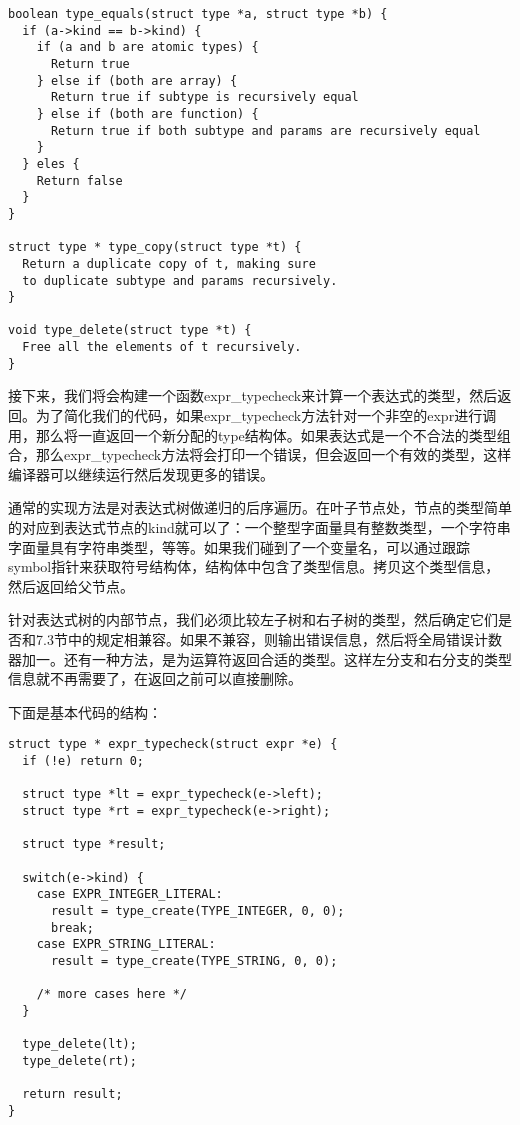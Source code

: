 \documentclass[cn,11pt,chinese]{elegantbook}
\begin{document}
\begin{verbatim}
boolean type_equals(struct type *a, struct type *b) {
  if (a->kind == b->kind) {
    if (a and b are atomic types) {
      Return true
    } else if (both are array) {
      Return true if subtype is recursively equal
    } else if (both are function) {
      Return true if both subtype and params are recursively equal
    }
  } eles {
    Return false
  }
}

struct type * type_copy(struct type *t) {
  Return a duplicate copy of t, making sure
  to duplicate subtype and params recursively.
}

void type_delete(struct type *t) {
  Free all the elements of t recursively.
}
\end{verbatim}

接下来，我们将会构建一个函数expr\_typecheck来计算一个表达式的类型，然后返回。为了简化我们的代码，如果expr\_typecheck方法针对一个非空的expr进行调用，那么将一直返回一个新分配的type结构体。如果表达式是一个不合法的类型组合，那么expr\_typecheck方法将会打印一个错误，但会返回一个有效的类型，这样编译器可以继续运行然后发现更多的错误。

通常的实现方法是对表达式树做递归的后序遍历。在叶子节点处，节点的类型简单的对应到表达式节点的kind就可以了：一个整型字面量具有整数类型，一个字符串字面量具有字符串类型，等等。如果我们碰到了一个变量名，可以通过跟踪symbol指针来获取符号结构体，结构体中包含了类型信息。拷贝这个类型信息，然后返回给父节点。

针对表达式树的内部节点，我们必须比较左子树和右子树的类型，然后确定它们是否和7.3节中的规定相兼容。如果不兼容，则输出错误信息，然后将全局错误计数器加一。还有一种方法，是为运算符返回合适的类型。这样左分支和右分支的类型信息就不再需要了，在返回之前可以直接删除。

下面是基本代码的结构：

\begin{verbatim}
struct type * expr_typecheck(struct expr *e) {
  if (!e) return 0;
    
  struct type *lt = expr_typecheck(e->left);
  struct type *rt = expr_typecheck(e->right);
    
  struct type *result;
  
  switch(e->kind) {
    case EXPR_INTEGER_LITERAL:
      result = type_create(TYPE_INTEGER, 0, 0);
      break;
    case EXPR_STRING_LITERAL:
      result = type_create(TYPE_STRING, 0, 0);
          
    /* more cases here */
  }
    
  type_delete(lt);
  type_delete(rt);
    
  return result;
}
\end{verbatim}
\end{document}
